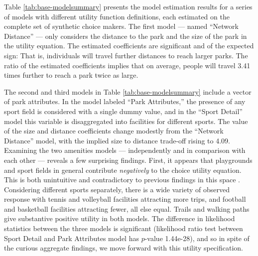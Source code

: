 \documentclass[3p, authoryear, review]{elsarticle} %
\begin{document}
Table \ref{tab:base-modelsummary} presents the model estimation results for a
series of models with different utility function definitions, each estimated on the
complete set of synthetic choice makers. The first model --- named ``Network
Distance'' --- only considers the distance to the park and the size of the park
in the utility equation. The estimated coefficients are significant and of the
expected sign: That is, individuals will travel further distances to reach larger
parks. The ratio of the estimated coefficients implies that on average, people
will travel 3.41 times further to reach a park twice as large.

The second and third models in Table \ref{tab:base-modelsummary} include a
vector of park attributes. In the model labeled ``Park Attributes,'' the presence
of any sport field is considered with a single dummy value, and in the ``Sport
Detail'' model this variable is disaggregated into facilities for different
sports. The value of the size and distance coefficients change modestly from
the ``Network Distance'' model, with the implied size to distance trade-off rising
to 4.09. Examining the two amenities models --- independently and in
comparison with each other --- reveals a few surprising findings. First, it
appears that playgrounds and sport fields in general contribute \emph{negatively} to
the choice utility equation. This is both unintuitive and contradictory to
previous findings in this space \citep[e.g.,][]{Kinnell2006}. Considering different
sports separately, there is a wide variety of observed response with tennis and
volleyball facilities attracting more trips, and football and basketball
facilities attracting fewer, all else equal. Trails and walking paths give
substantive positive utility in both models. The difference in likelihood statistics
between the three models is significant (likelihood ratio test between Sport Detail
and Park Attributes model has \(p\)-value 1.44e-28), and so in spite of the
curious aggregate findings, we move forward with this utility specification.
\end{document}
